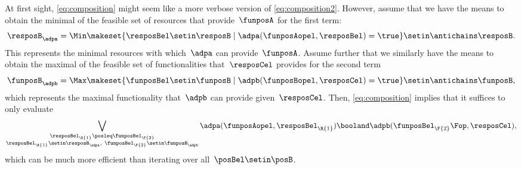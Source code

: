 At first sight, \cref{eq:composition} might seem like a more verbose version of \cref{eq:composition2}.
However, assume that we have the means to obtain the minimal    of the feasible set of resources that provide~$\funposA$ for the first term:
\begin{equation}
    \resposB_\adpa = \Min \makeset{\resposBel\setin \resposB \mid \adpa(\funposAopel,\resposBel)=\true} \setin \antichains \resposB.
\end{equation}
This represents the minimal resources with which~$\adpa$ can provide~$\funposA$.
Assume further that we similarly have the means to obtain the maximal    of the feasible set of functionalities that~$\resposCel$ provides for the second term
\begin{equation}
    \funposB_\adpb = \Max \makeset{\funposBel\setin \funposB \mid \adpb(\funposBopel,\resposCel)=\true} \setin \antichains \funposB,
\end{equation}
which represents the maximal functionality that~$\adpb$ can provide given~$\resposCel$.
Then, \cref{eq:composition} implies that it suffices to only evaluate
\begin{equation}
    \bigvee_{\substack{\resposBel_\R{1}\posleq\funposBel_\F{2} \\ \resposBel_\R{1}\setin \resposB_\adpa,~ \funposBel_\F{2}\setin\funposB_\adpb }} \adpa(\funposAopel,\resposBel_\R{1}) \booland \adpb(\funposBel_\F{2}\Fop,\resposCel),
\end{equation}
which can be much more efficient than iterating over all~$\posBel\setin \posB$.
